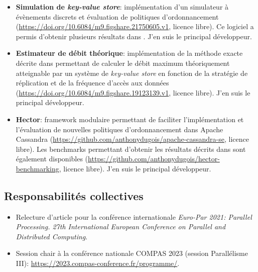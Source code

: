 \documentclass[12pt]{article}
\begin{document}
\begin{itemize}
    \item \textbf{Simulation de \emph{key-value store}}: implémentation d'un simulateur à évènements
    discrets et évaluation de politiques d'ordonnancement
    (\url{https://doi.org/10.6084/m9.figshare.21750605.v1}, licence libre). Ce logiciel a permis
    d'obtenir plusieurs résultats dans \cite{benmokhtar2021}. J'en suis le
    principal développeur.
    \item \textbf{Estimateur de débit théorique}: implémentation de la méthode exacte décrite dans
    \cite{canon2022} permettant de calculer le débit maximum théoriquement atteignable par un
    système de \emph{key-value store} en fonction de la stratégie de réplication et de la fréquence
    d'accès aux données (\url{https://doi.org/10.6084/m9.figshare.19123139.v1}, licence libre). J'en
    suis le principal développeur.
    \item \textbf{Hector}: framework modulaire permettant de faciliter l'implémentation et
    l'évaluation de nouvelles politiques d'ordonnancement dans Apache Cassandra
    (\url{https://github.com/anthonydugois/apache-cassandra-se}, licence libre). Les benchmarks
    permettant d'obtenir les résultats décrits dans \cite{canon2023b} sont également disponibles
    (\url{https://github.com/anthonydugois/hector-benchmarking}, licence libre). J'en suis le
    principal développeur.
\end{itemize}

\subsection{Responsabilités collectives}

\begin{itemize}
    \item Relecture d'article pour la conférence internationale
    \emph{\foreignlanguage{english}{Euro-Par 2021: Parallel Processing. 27th International European
    Conference on Parallel and Distributed Computing}}.
    \item Session chair à la conférence nationale COMPAS 2023 (session Parallélisme III):
    \url{https://2023.compas-conference.fr/programme/}.
\end{itemize}
\end{document}

